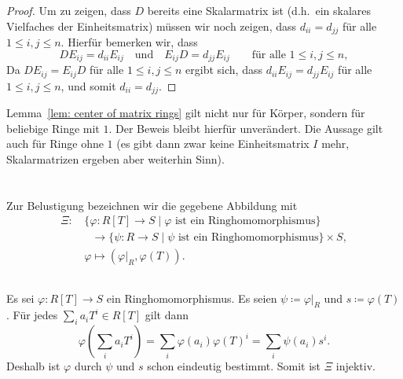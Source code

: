 \documentclass[a4paper, 10pt, numbers=noenddot]{scrartcl}
\begin{document}
\begin{proof}
  Um zu zeigen, dass $D$ bereits eine Skalarmatrix ist (d.h.\ ein skalares Vielfaches der Einheitsmatrix) müssen wir noch zeigen, dass $d_{ii} = d_{jj}$ für alle $1 \leq i,j \leq n$.
  Hierfür bemerken wir, dass
  \[
    D E_{ij} = d_{ii} E_{ij}
    \quad\text{und}\quad
    E_{ij} D = d_{jj} E_{ij}
    \qquad
    \text{für alle $1 \leq i,j \leq n$},
  \]
  Da $D E_{ij} = E_{ij} D$ für alle $1 \leq i,j \leq n$ ergibt sich, dass $d_{ii} E_{ij} = d_{jj} E_{ij}$ für alle $1 \leq i,j \leq n$, und somit $d_{ii} = d_{jj}$.
\end{proof}


\begin{remark}
  Lemma~\ref{lem: center of matrix rings} gilt nicht nur für Körper, sondern für beliebige Ringe mit $1$.
  Der Beweis bleibt hierfür unverändert.
  Die Aussage gilt auch für Ringe ohne $1$ (es gibt dann zwar keine Einheitsmatrix $I$ mehr, Skalarmatrizen ergeben aber weiterhin Sinn).
\end{remark}












\section{}

Zur Belustigung bezeichnen wir die gegebene Abbildung mit
\begin{align*}
              \Xi
  \colon&\,   \{ \varphi  \colon R[T] \to S \mid \text{$\varphi$ ist ein Ringhomomorphismus} \}
  \\
        &\,   \phantom{\varphi} \to \{ \psi \colon R \to S        \mid \text{$\psi$ ist ein Ringhomomorphismus} \}
                                    \times S,
  \\
         &\,  \varphi
  \mapsto     (\varphi|_R, \varphi(T)).
\end{align*}





\subsection{}

Es sei $\varphi \colon R[T] \to S$ ein Ringhomomorphismus.
Es seien $\psi \coloneqq \varphi|_R$ und $s \coloneqq \varphi(T)$.
Für jedes $\sum_i a_i T^i \in R[T]$ gilt dann
\[
    \varphi\left( \sum_i a_i T^i \right)
  = \sum_i \varphi(a_i) \varphi(T)^i
  = \sum_i \psi(a_i) s^i.
\]
Deshalb ist $\varphi$ durch $\psi$ und $s$ schon eindeutig bestimmt.
Somit ist $\Xi$ injektiv.
\end{document}
